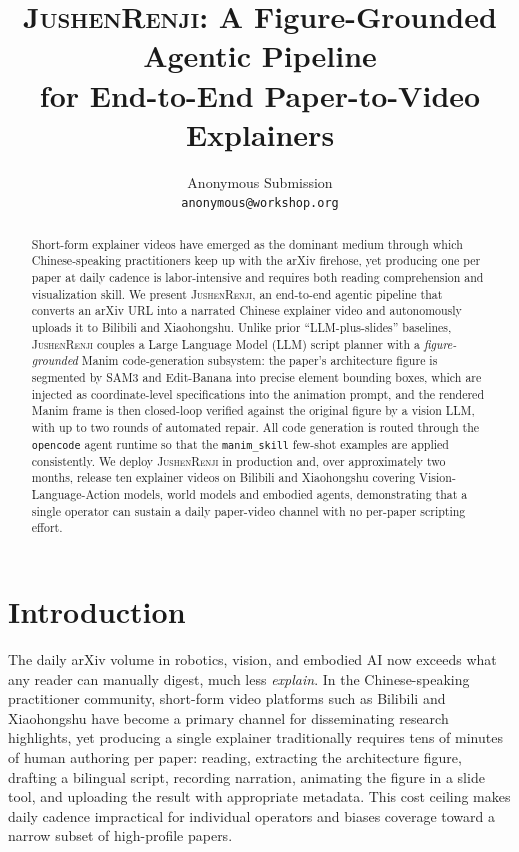 \documentclass[11pt,a4paper]{article}
\title{\textsc{JushenRenji}: A Figure-Grounded Agentic Pipeline\\
for End-to-End Paper-to-Video Explainers}
\author{%
  Anonymous Submission\\
  \texttt{anonymous@workshop.org}
}
\date{}
\begin{document}
\maketitle

\begin{abstract}
Short-form explainer videos have emerged as the dominant medium through which Chinese-speaking practitioners keep up with the arXiv firehose, yet producing one per paper at daily cadence is labor-intensive and requires both reading comprehension and visualization skill. We present \textsc{JushenRenji}, an end-to-end agentic pipeline that converts an arXiv URL into a narrated Chinese explainer video and autonomously uploads it to Bilibili and Xiaohongshu. Unlike prior ``LLM-plus-slides'' baselines, \textsc{JushenRenji} couples a Large Language Model (LLM) script planner with a \emph{figure-grounded} Manim code-generation subsystem: the paper's architecture figure is segmented by SAM3 and Edit-Banana into precise element bounding boxes, which are injected as coordinate-level specifications into the animation prompt, and the rendered Manim frame is then closed-loop verified against the original figure by a vision LLM, with up to two rounds of automated repair. All code generation is routed through the \texttt{opencode} agent runtime so that the \texttt{manim\_skill} few-shot examples are applied consistently. We deploy \textsc{JushenRenji} in production and, over approximately two months, release ten explainer videos on Bilibili and Xiaohongshu covering Vision-Language-Action models, world models and embodied agents, demonstrating that a single operator can sustain a daily paper-video channel with no per-paper scripting effort.
\end{abstract}

\section{Introduction}
\label{sec:intro}

The daily arXiv volume in robotics, vision, and embodied AI now exceeds what any reader can manually digest, much less \emph{explain}. In the Chinese-speaking practitioner community, short-form video platforms such as Bilibili and Xiaohongshu have become a primary channel for disseminating research highlights, yet producing a single explainer traditionally requires tens of minutes of human authoring per paper: reading, extracting the architecture figure, drafting a bilingual script, recording narration, animating the figure in a slide tool, and uploading the result with appropriate metadata. This cost ceiling makes daily cadence impractical for individual operators and biases coverage toward a narrow subset of high-profile papers.
\end{document}

